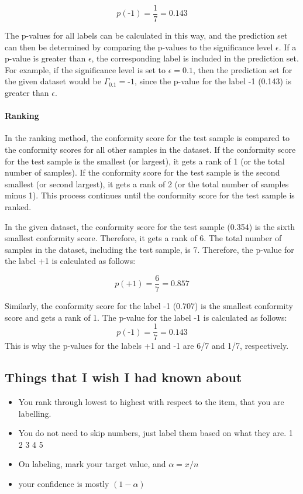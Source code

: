 $$ p(\text{-1}) = \frac{1}{7} = 0.143 $$

The p-values for all labels can be calculated in this way, and the prediction set can then be determined by comparing the p-values to the significance level $\epsilon$. If a p-value is greater than $\epsilon$, the corresponding label is included in the prediction set. For example, if the significance level is set to $\epsilon = 0.1$, then the prediction set for the given dataset would be $\Gamma_{0.1} = {\text{-1}}$, since the p-value for the label -1 (0.143) is greater than $\epsilon$.

\paragraph{Ranking}
In the ranking method, the conformity score for the test sample is compared to the conformity scores for all other samples in the dataset. If the conformity score for the test sample is the smallest (or largest), it gets a rank of 1 (or the total number of samples). If the conformity score for the test sample is the second smallest (or second largest), it gets a rank of 2 (or the total number of samples minus 1). This process continues until the conformity score for the test sample is ranked.

In the given dataset, the conformity score for the test sample (0.354) is the sixth smallest conformity score. Therefore, it gets a rank of 6. The total number of samples in the dataset, including the test sample, is 7. Therefore, the p-value for the label +1 is calculated as follows:

$$ p(\text{+1}) = \frac{6}{7} = 0.857 $$

Similarly, the conformity score for the label -1 (0.707) is the smallest conformity score and gets a rank of 1. The p-value for the label -1 is calculated as follows:
$$ p(\text{-1}) = \frac{1}{7} = 0.143 $$
This is why the p-values for the labels +1 and -1 are 6/7 and 1/7, respectively.


\subsection{Things that I wish I had known about}
\begin{itemize}
	\item You rank through lowest to highest with respect to the item, that you are labelling.
	\item You do not need to skip numbers, just label them based on what they are.
	      1 2 3 4 5
	\item On labeling, mark your target value, and $\alpha = x/n $
	\item your confidence is mostly $ (1-\alpha) $
\end{itemize}


